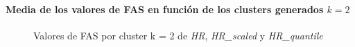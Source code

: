 \paragraph{Media de los valores de FAS en función de los clusters generados $k = 2$}

\begin{figure}[H]
    \centering
    \caption{Valores de FAS por cluster k = 2 de \textit{HR}, \textit{HR\_scaled} y \textit{HR\_quantile}}\label{fig:acf_cls_fc}
\end{figure}

